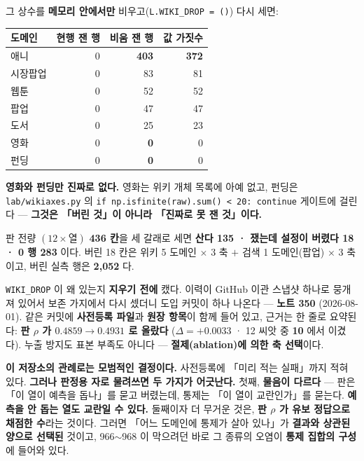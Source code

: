 \documentclass[10pt]{article}
\begin{document}
그 상수를 \textbf{메모리 안에서만} 비우고(\texttt{L.WIKI\_DROP = ()}) 다시 세면:

\begin{center}\small
\begin{tabular}{lrrr}
도메인 & 현행 잰 행 & \textbf{비움 잰 행} & \textbf{값 가짓수} \\
\hline
애니 & 0 & \textbf{403} & \textbf{372} \\
시장팝업 & 0 & 83 & 81 \\
웹툰 & 0 & 52 & 52 \\
팝업 & 0 & 47 & 47 \\
도서 & 0 & 25 & 23 \\
\hline
영화 & 0 & \textbf{0} & 0 \\
펀딩 & 0 & \textbf{0} & 0 \\
\end{tabular}
\end{center}

\textbf{영화와 펀딩만 진짜로 없다.} 영화는 위키 개체 목록에 아예 없고, 펀딩은
\texttt{lab/wikiaxes.py} 의 \texttt{if np.isfinite(raw).sum() < 20: continue} 게이트에
걸린다 --- \textbf{그것은 「버린 것」이 아니라 「진짜로 못 잰 것」이다.}

판 전량 $(12 \times \text{열})$ \textbf{436 칸}을 세 갈래로 세면
\textbf{산다 135 · 쟀는데 설정이 버렸다 18 · 0 행 283} 이다. 버린 18 칸은
위키 5 도메인 $\times$ 3 축 $+$ 검색 1 도메인(팝업) $\times$ 3 축이고, 버린 실측 행은
\textbf{2{,}052} 다.


\texttt{WIKI\_DROP} 이 왜 있는지 \textbf{지우기 전에} 캤다. 이력이 GitHub 이관 스냅샷
하나로 뭉개져 있어서 보존 가지에서 다시 셌더니 도입 커밋이 하나 나온다 --- \textbf{노트 350}
(2026-08-01). 같은 커밋에 \textbf{사전등록 파일}과 \textbf{원장 항목}이 함께 들어 있고,
근거는 한 줄로 요약된다: \textbf{판 $\rho$ 가 $0.4859 \to 0.4931$ 로 올랐다}
($\Delta = +0.0033$ · 12 씨앗 중 \textbf{10} 에서 이겼다). 누출 방지도 표본 부족도
아니다 --- \textbf{절제(ablation)에 의한 축 선택}이다.

\textbf{이 저장소의 관례로는 모범적인 결정이다.} 사전등록에 「미리 적는 실패」까지 적혀 있다.
\textbf{그러나 판정용 자로 물려쓰면 두 가지가 어긋난다.} 첫째, \textbf{물음이 다르다} ---
판은 「이 열이 예측을 돕나」를 묻고 버렸는데, 통제는 「이 열이 교란인가」를 묻는다.
\textbf{예측을 안 돕는 열도 교란일 수 있다.} 둘째이자 더 무거운 것은,
\textbf{판 $\rho$ 가 유보 정답으로 채점한 수}라는 것이다. 그러면 「어느 도메인에 통제가
살아 있나」가 \textbf{결과와 상관된 양으로 선택된} 것이고, 966$\sim$968 이 막으려던 바로
그 종류의 오염이 \textbf{통제 집합의 구성}에 들어와 있다.
\end{document}

